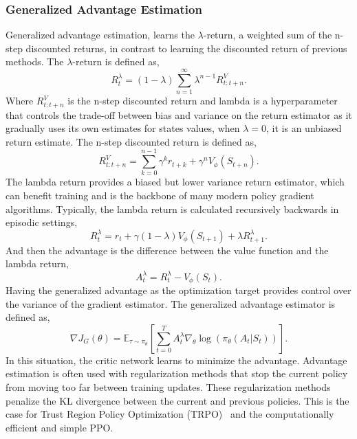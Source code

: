 \subsubsection{Generalized Advantage Estimation}
Generalized advantage estimation\cite{schulman2015high}, learns the $\lambda$-return, a weighted sum of the n-step discounted returns, in contrast to learning the discounted return of previous methods. The $\lambda$-return is defined as,
\begin{equation}
	R_t^\lambda = (1-\lambda) \sum_{n=1}^\infty \lambda^{n-1} R_{t:t+n}^V.
\end{equation}
Where $R_{t:t+n}^V$ is the n-step discounted return and lambda is a hyperparameter that controls the trade-off between bias and variance on the return estimator as it gradually uses its own estimates for states values, when $\lambda = 0$, it is an unbiased return estimate. The n-step discounted return is defined as,
\begin{equation}
	R_{t:t+n}^V = \sum_{k=0}^{n-1} \gamma^k r_{t+k} + \gamma^n V_\phi(S_{t+n}).
\end{equation}
The lambda return provides a biased but lower variance return estimator, which can benefit training and is the backbone of many modern policy gradient algorithms. Typically, the lambda return is calculated recursively backwards in episodic settings,
\begin{equation}
	R_t^\lambda = r_t + \gamma (1-\lambda) V_\phi(S_{t+1}) + \lambda R_{t+1}^\lambda.
\end{equation}
And then the advantage is the difference between the value function and the lambda return,
\begin{equation}
	A_t^\lambda = R_t^\lambda - V_\phi(S_t).
\end{equation}
Having the generalized advantage as the optimization target provides control over the variance of the gradient estimator. The generalized advantage estimator is defined as,
\begin{equation}
	\nabla J_G(\theta)  = \mathbb{E}_{\tau \sim \pi_\theta} \left[\sum_{t=0} ^ T A_t^\lambda \nabla_\theta \log(\pi_\theta(A_t|S_t))\right].
\end{equation}
In this situation, the critic network learns to minimize the advantage. Advantage estimation is often used with regularization methods that stop the current policy from moving too far between training updates. These regularization methods penalize the KL divergence between the current and previous policies. This is the case for Trust Region Policy Optimization (TRPO)~\cite{shculman2015trust} and the computationally efficient and simple PPO\cite{schulman2017proximal}.

